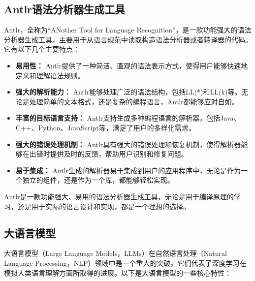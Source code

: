 \subsection{Antlr语法分析器生成工具}

Antlr\cite{parr2004s}，全称为“ANother Tool for Language Recognition”，是一款功能强大的语法分析器生成工具，主要用于从语言规范中读取构造语法分析器或者转译器的代码。它有以下几个主要特点：

\begin{itemize}
    \item \textbf{易用性：} Antlr提供了一种简洁、直观的语法表示方式，使得用户能够快速地定义和理解语法规则。
    \item \textbf{强大的解析能力：} Antlr能够处理广泛的语法结构，包括LL(*)\cite{parr2011ll}和LL(k)\cite{parr1995antlr}等。无论是处理简单的文本格式，还是复杂的编程语言，Antlr都能够应对自如。
    \item \textbf{丰富的目标语言支持：} Antlr支持生成多种编程语言的解析器，包括Java、C++、Python、JavaScript等，满足了用户的多样化需求。
    \item \textbf{强大的错误处理机制：} Antlr具有强大的错误处理和恢复机制，使得解析器能够在出错时提供及时的反馈，帮助用户识别和修复问题。
    \item \textbf{易于集成：} Antlr生成的解析器易于集成到用户的应用程序中，无论是作为一个独立的组件，还是作为一个库，都能够轻松实现。
\end{itemize}

Antlr是一款功能强大、易用的语法分析器生成工具，无论是用于编译原理的学习，还是用于实际的语言设计和实现，都是一个理想的选择。

\subsection{大语言模型}
大语言模型\cite{zhao2023survey}（Large Language Models，LLMs）在自然语言处理\cite{zhou2020progress}（Natural Language Processing，NLP）领域中是一个重大的突破。它们代表了深度学习在模拟人类语言理解方面所取得的进展。以下是大语言模型的一些核心特性：

